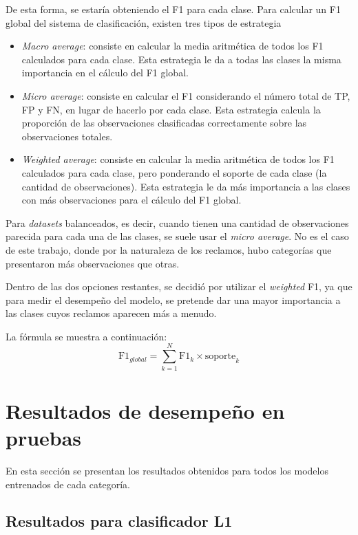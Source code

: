 De esta forma, se estaría obteniendo el F1 para cada clase. Para calcular un F1 global del sistema de clasificación, existen tres tipos de estrategia \citep{WEBSITE:28}
\begin{itemize}
	\item \textit{Macro average}: consiste en calcular la media aritmética de todos los F1 calculados para cada clase. Esta estrategia le da a todas las clases la misma importancia en el cálculo del F1 global.
	\item \textit{Micro average}: consiste en calcular el F1 considerando el número total de TP, FP y FN, en lugar de hacerlo por cada clase. Esta estrategia calcula la proporción de las observaciones clasificadas correctamente sobre las observaciones totales.
	\item \textit{Weighted average}: consiste en calcular la media aritmética de todos los F1 calculados para cada clase, pero ponderando el soporte de cada clase (la cantidad de observaciones). Esta estrategia le da más importancia a las clases con más observaciones para el cálculo del F1 global.
\end{itemize}

Para \textit{datasets} balanceados, es decir, cuando tienen una cantidad de observaciones parecida para cada una de las clases, se suele usar el \textit{micro average}. No es el caso de este trabajo, donde por la naturaleza de los reclamos, hubo categorías que presentaron más observaciones que otras.

Dentro de las dos opciones restantes, se decidió por utilizar el \textit{weighted} F1, ya que para medir el desempeño del modelo, se pretende dar una mayor importancia a las clases cuyos reclamos aparecen más a menudo. 

La fórmula se muestra a continuación:
\begin{equation}
\text{F1}_{global}=\sum_{k=1}^{N}\text{F1}_{k} \times \text{soporte}_{k} 
\end{equation}

\section{Resultados de desempeño en pruebas}

En esta sección se presentan los resultados obtenidos para todos los modelos entrenados de cada categoría.

\subsection{Resultados para clasificador L1}

